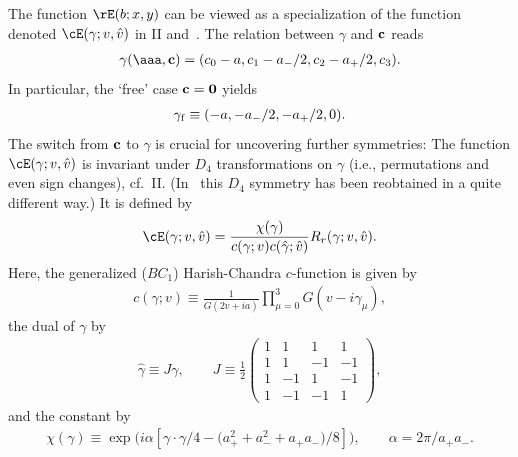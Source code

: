 \documentclass[pdftex]{sigma}
\numberwithin{equation}{section}
\begin{document}
The function $\rE(b;x,y)$ can be viewed as a specialization of the function denoted $\cE(\gamma;v,\hat{v})$ in II and~\cite{Rsurv}. The relation between $\gamma$ and ${\bf c}$ reads
\begin{gather}\label{gamc}
\gamma(\aaa,{\bf c})=(c_0-a,c_1-a_{-}/2,c_2-a_{+}/2,c_3).
\end{gather}
In particular, the `free' case ${\bf c}={\bf 0}$ yields
\begin{gather}\label{gamf}
\gamma_{\rm f}\equiv (-a,-a_{-}/2,-a_{+}/2,0).
\end{gather}
The switch from ${\bf c}$ to $\gamma$ is crucial for uncovering further symmetries: The function $\cE(\gamma;v,\hat{v})$ is invariant under $D_4$ transformations on $\gamma$ (i.e., permutations and even sign changes), cf.~II. (In~\cite{bust} this $D_4$ symmetry has been reobtained in a quite dif\/ferent way.) It is def\/ined by
\begin{gather}
\cE(\gamma;v,\hat{v})=\frac{\chi(\gamma)}{c(\gamma;v)c(\hat{\gamma};\hat{v})}R_r(\gamma;v,\hat{v}).
\end{gather}
Here, the generalized ($BC_1$) Harish-Chandra $c$-function is given by
\begin{gather}\label{c}
c(\gamma;v)\equiv \frac{1}{G(2v+ia)}\prod_{\mu =0}^3G(v-i\gamma_{\mu}),
\end{gather}
the dual of $\gamma$ by
\begin{gather}\label{dualgam}
\hat{\gamma}\equiv J\gamma,\qquad
J\equiv \frac{1}{2} \left( \begin{array}{rrrr}
1  &  1  &  1  &  1  \\
1  &  1  &  -1  &  -1  \\
1  &  -1  &  1  &  -1  \\
1  &  -1  &  -1  &  1
\end{array} \right) ,
\end{gather}
and the constant by
\begin{gather}\label{chigam}
\chi(\gamma) \equiv \exp\big(i\alpha [\gamma\cdot \gamma /4-\big(a_{+}^2+a_{-}^2+a_{+}a_{-}\big)/8]\big),\qquad
\alpha =2\pi/a_{+}a_{-}.
\end{gather}
\end{document}
